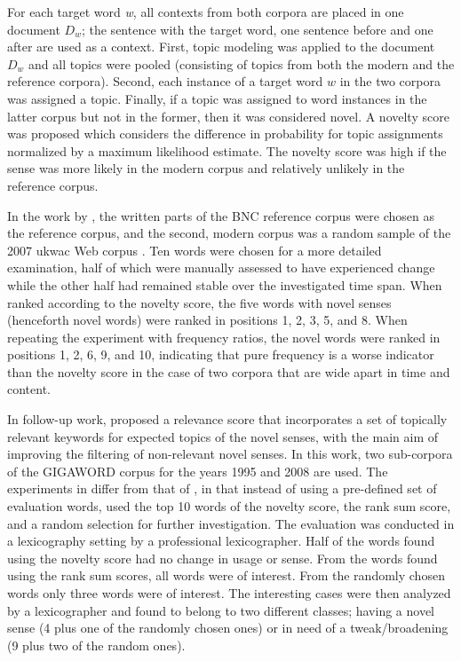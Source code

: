 \documentclass[output=paper]{langsci/langscibook}
\begin{document}
For each target word \textit{w}, all contexts from both corpora are placed in one document $D_w$; the sentence with the target word, one sentence before and one after are used as a context. 
First, topic modeling was applied to the document $D_w$ and all topics were pooled (consisting of topics from both the modern and the reference corpora). 
 Second, each instance of a target word $w$ in the two corpora was assigned a topic. 
 Finally, if a topic was assigned to word instances in the latter corpus but not in the former, then it was considered novel. A novelty score was proposed which considers the difference in probability for topic assignments normalized by a maximum likelihood estimate. The novelty score was high if the sense was more likely in the modern corpus and relatively unlikely in the reference corpus. 

In the work by \citet{lau-etal-2012-word}, the written parts of the BNC reference corpus were chosen as the reference corpus, and the second, modern corpus was a random sample of the 2007 ukwac Web corpus \citep{ukwac}. Ten words were chosen for a more detailed examination, half of which were manually assessed to have experienced change while the other half had remained stable over the investigated time span. When ranked according to the novelty score, the five words with novel senses (henceforth novel words) were ranked in positions 1, 2, 3, 5, and 8. When repeating the experiment with frequency ratios, the novel words were ranked in positions 1, 2, 6, 9, and 10, indicating that pure frequency is a worse indicator than the novelty score in the case of two corpora that are wide apart in time and content. 


In follow-up work, \citet{cook13alexicographic} proposed  a relevance score that incorporates a set of topically relevant keywords for expected topics of the novel senses, with the main aim of improving the filtering of non-relevant novel senses. In this work, two sub-corpora  of the GIGAWORD corpus for  the  years  1995 and  2008 are used. The experiments in \citet{cook13alexicographic} differ from that of \citet{lau-etal-2012-word}, in that instead of using a pre-defined set of evaluation words, \citet{cook13alexicographic} used the top 10 words of the novelty score, the rank sum score, and a random selection for further investigation. The evaluation was conducted in a lexicography setting by a professional lexicographer. Half of the words found using the novelty score had no change in usage or sense. From the words found using the rank sum scores, all words were of interest. From the randomly chosen words only three words were of interest. The interesting cases were then  analyzed by a lexicographer and found to belong to two different classes; having a novel sense (4 plus one of the randomly chosen ones) or in need of a tweak/broadening (9 plus two of the random ones). 
\end{document}
